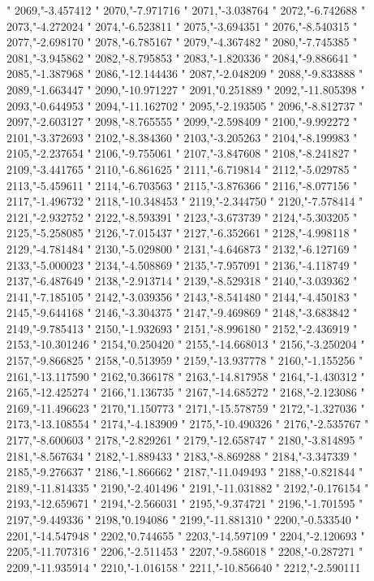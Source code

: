 "
2069,"-3.457412
"
2070,"-7.971716
"
2071,"-3.038764
"
2072,"-6.742688
"
2073,"-4.272024
"
2074,"-6.523811
"
2075,"-3.694351
"
2076,"-8.540315
"
2077,"-2.698170
"
2078,"-6.785167
"
2079,"-4.367482
"
2080,"-7.745385
"
2081,"-3.945862
"
2082,"-8.795853
"
2083,"-1.820336
"
2084,"-9.886641
"
2085,"-1.387968
"
2086,"-12.144436
"
2087,"-2.048209
"
2088,"-9.833888
"
2089,"-1.663447
"
2090,"-10.971227
"
2091,"0.251889
"
2092,"-11.805398
"
2093,"-0.644953
"
2094,"-11.162702
"
2095,"-2.193505
"
2096,"-8.812737
"
2097,"-2.603127
"
2098,"-8.765555
"
2099,"-2.598409
"
2100,"-9.992272
"
2101,"-3.372693
"
2102,"-8.384360
"
2103,"-3.205263
"
2104,"-8.199983
"
2105,"-2.237654
"
2106,"-9.755061
"
2107,"-3.847608
"
2108,"-8.241827
"
2109,"-3.441765
"
2110,"-6.861625
"
2111,"-6.719814
"
2112,"-5.029785
"
2113,"-5.459611
"
2114,"-6.703563
"
2115,"-3.876366
"
2116,"-8.077156
"
2117,"-1.496732
"
2118,"-10.348453
"
2119,"-2.344750
"
2120,"-7.578414
"
2121,"-2.932752
"
2122,"-8.593391
"
2123,"-3.673739
"
2124,"-5.303205
"
2125,"-5.258085
"
2126,"-7.015437
"
2127,"-6.352661
"
2128,"-4.998118
"
2129,"-4.781484
"
2130,"-5.029800
"
2131,"-4.646873
"
2132,"-6.127169
"
2133,"-5.000023
"
2134,"-4.508869
"
2135,"-7.957091
"
2136,"-4.118749
"
2137,"-6.487649
"
2138,"-2.913714
"
2139,"-8.529318
"
2140,"-3.039362
"
2141,"-7.185105
"
2142,"-3.039356
"
2143,"-8.541480
"
2144,"-4.450183
"
2145,"-9.644168
"
2146,"-3.304375
"
2147,"-9.469869
"
2148,"-3.683842
"
2149,"-9.785413
"
2150,"-1.932693
"
2151,"-8.996180
"
2152,"-2.436919
"
2153,"-10.301246
"
2154,"0.250420
"
2155,"-14.668013
"
2156,"-3.250204
"
2157,"-9.866825
"
2158,"-0.513959
"
2159,"-13.937778
"
2160,"-1.155256
"
2161,"-13.117590
"
2162,"0.366178
"
2163,"-14.817958
"
2164,"-1.430312
"
2165,"-12.425274
"
2166,"1.136735
"
2167,"-14.685272
"
2168,"-2.123086
"
2169,"-11.496623
"
2170,"1.150773
"
2171,"-15.578759
"
2172,"-1.327036
"
2173,"-13.108554
"
2174,"-4.183909
"
2175,"-10.490326
"
2176,"-2.535767
"
2177,"-8.600603
"
2178,"-2.829261
"
2179,"-12.658747
"
2180,"-3.814895
"
2181,"-8.567634
"
2182,"-1.889433
"
2183,"-8.869288
"
2184,"-3.347339
"
2185,"-9.276637
"
2186,"-1.866662
"
2187,"-11.049493
"
2188,"-0.821844
"
2189,"-11.814335
"
2190,"-2.401496
"
2191,"-11.031882
"
2192,"-0.176154
"
2193,"-12.659671
"
2194,"-2.566031
"
2195,"-9.374721
"
2196,"-1.701595
"
2197,"-9.449336
"
2198,"0.194086
"
2199,"-11.881310
"
2200,"-0.533540
"
2201,"-14.547948
"
2202,"0.744655
"
2203,"-14.597109
"
2204,"-2.120693
"
2205,"-11.707316
"
2206,"-2.511453
"
2207,"-9.586018
"
2208,"-0.287271
"
2209,"-11.935914
"
2210,"-1.016158
"
2211,"-10.856640
"
2212,"-2.590111
